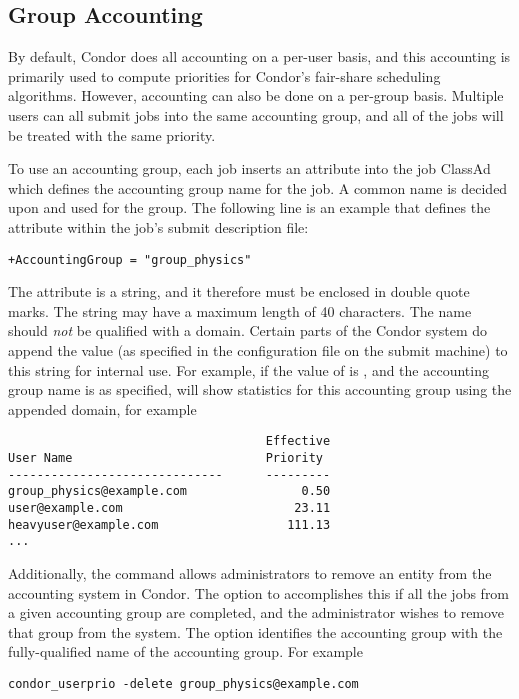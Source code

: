 \subsection{\label{sec:group-accounting}Group Accounting}

By default, Condor does all accounting on a per-user basis, and this
accounting is primarily used to compute priorities for Condor's
fair-share scheduling algorithms. 
However, accounting can also be done on a per-group basis.
Multiple users can all submit jobs into the same accounting group,
and all of the jobs will be treated with the same priority.

To use an accounting group,
each job inserts an attribute into the job ClassAd which
defines the accounting group name for the job.
A common name is decided upon and used for the group.
The following line is an example that defines the attribute
within the job's submit description file:
\begin{verbatim}
+AccountingGroup = "group_physics"
\end{verbatim}

The  attribute is a string,
and it therefore must be enclosed in double quote marks.
The string may have a maximum length of 40 characters.
The name should \emph{not} be qualified with a domain.
Certain parts of the Condor system 
do append the value 
(as specified in the configuration file on the submit machine)
to this string for internal use.
For example, if the value of  is
, and the accounting group name
is as specified,
 will show statistics
for this accounting group using the appended domain, for example
\footnotesize
\begin{verbatim}
                                    Effective
User Name                           Priority
------------------------------      ---------
group_physics@example.com                0.50
user@example.com                        23.11
heavyuser@example.com                  111.13
...
\end{verbatim}
\normalsize

Additionally, the  command allows administrators to
remove an entity from the accounting system in Condor.
The  option to 
accomplishes this
if all the jobs from a given accounting group are completed,
and the administrator wishes to remove that group from the system.
The  option
identifies the accounting group with the fully-qualified name
of the accounting group.
For example
\footnotesize
\begin{verbatim}
condor_userprio -delete group_physics@example.com
\end{verbatim}
\normalsize

